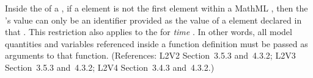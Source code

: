 Inside the  of a \FunctionDefinition, if a  element
is not the first element within a MathML , then the
's value can only be an identifier provided as the
value of a  element declared in that .
This restriction also applies to the  for \emph{time} .
In other words, all model quantities and variables referenced
inside a function definition must be passed as arguments to that function.
(References: L2V2 Section~3.5.3 and~4.3.2; L2V3 Section~3.5.3 and~4.3.2; L2V4 Section~3.4.3 and~4.3.2.)
